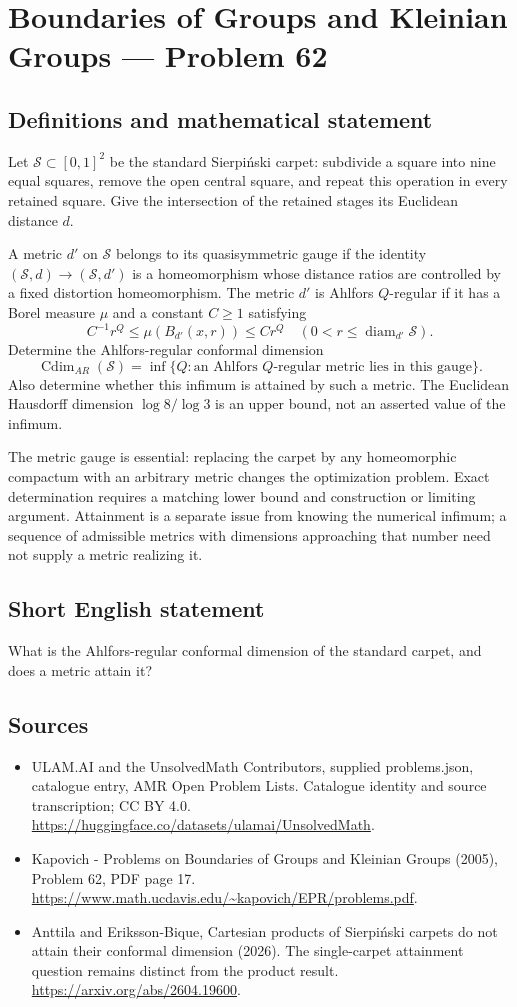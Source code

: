 \documentclass[11pt,a4paper]{article}
\begin{document}
\section*{Boundaries of Groups and Kleinian Groups — Problem 62}\label{statement}

\subsection{Definitions and mathematical statement}
Let $\mathcal S\subset[0,1]^2$ be the standard Sierpi\'nski carpet: subdivide a square into nine equal squares, remove the open central square, and repeat this operation in every retained square. Give the intersection of the retained stages its Euclidean distance $d$.

A metric $d'$ on $\mathcal S$ belongs to its quasisymmetric gauge if the identity $(\mathcal S,d)\to(\mathcal S,d')$ is a homeomorphism whose distance ratios are controlled by a fixed distortion homeomorphism. The metric $d'$ is Ahlfors $Q$-regular if it has a Borel measure $\mu$ and a constant $C\geq1$ satisfying
\[
 C^{-1}r^Q\leq\mu(B_{d'}(x,r))\leq Cr^Q
 \quad(0<r\leq\operatorname{diam}_{d'}\mathcal S).
\]
Determine the Ahlfors-regular conformal dimension
\[
 \operatorname{Cdim}_{AR}(\mathcal S)=
 \inf\{Q:\text{an Ahlfors $Q$-regular metric lies in this gauge}\}.
\]
Also determine whether this infimum is attained by such a metric. The Euclidean Hausdorff dimension $\log8/\log3$ is an upper bound, not an asserted value of the infimum.

The metric gauge is essential: replacing the carpet by any homeomorphic compactum with an arbitrary metric changes the optimization problem. Exact determination requires a matching lower bound and construction or limiting argument. Attainment is a separate issue from knowing the numerical infimum; a sequence of admissible metrics with dimensions approaching that number need not supply a metric realizing it.
\subsection{Short English statement}
What is the Ahlfors-regular conformal dimension of the standard carpet, and does a metric attain it?
\subsection{Sources}
\begin{itemize}
\item[S1] ULAM.AI and the UnsolvedMath Contributors, supplied problems.json, catalogue entry, AMR Open Problem Lists. Catalogue identity and source transcription; CC BY 4.0.
\url{https://huggingface.co/datasets/ulamai/UnsolvedMath}.
\item[S2] Kapovich - Problems on Boundaries of Groups and Kleinian Groups (2005), Problem 62, PDF page 17. 
\url{https://www.math.ucdavis.edu/~kapovich/EPR/problems.pdf}.
\item[S3] Anttila and Eriksson-Bique, Cartesian products of Sierpiński carpets do not attain their conformal dimension (2026). The single-carpet attainment question remains distinct from the product result.
\url{https://arxiv.org/abs/2604.19600}.
\end{itemize}
\end{document}
